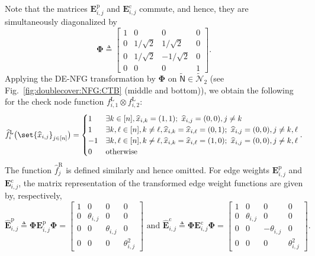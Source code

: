\documentclass[conference]{IEEEtran}
\theoremstyle{plain}
\theoremstyle{definition}
\newcommand{\sfn}{\mathsf{N}}
\newcommand{\fl}[1]{ f^{\mathrm{L}}_{ #1 } }
\newcommand{\hatfr}[1]{\widehat{f}^{\mathrm{R}}_{ #1 }}
\newcommand{\hatfl}[1]{\widehat{f}^{\mathrm{L}}_{ #1 }}
\newcommand{\hatx}[1]{\widehat{x}_{ #1 }}
\newcommand{\defeq}{\triangleq}
\begin{document}
 Note that the matrices $\mathbf E_{i,j}^{\mathrm{p}}$ and $\mathbf
 E_{i,j}^{\mathrm{c}}$ commute, and hence, they are simultaneously diagonalized
 by
 \[
  \boldsymbol{\Phi}\defeq\begin{bmatrix}
   1 & 0          & 0           & 0 \\
   0 & 1/\sqrt{2} & 1/\sqrt{2}  & 0 \\
   0 & 1/\sqrt{2} & -1/\sqrt{2} & 0 \\
   0 & 0          & 0           & 1
  \end{bmatrix}.
 \]
 Applying the DE-NFG transformation by $\boldsymbol \Phi$ on
 $\widetilde{\sfn}\in\widetilde{\mathcal{N}}_2$ (see
 Fig.~\ref{fig:doublecover:NFG:CTB} (middle and bottom)), we obtain the
 following for the check node function $\fl{i,1}\otimes \fl {i,2}$:
 \[
  \hatfl{i}\big(\set{\hatx{i,j}}_{j\in[n]}\big)
  =
  \begin{cases}
  1  & \exists k \in [n], \hatx{i,k}=(1,1);
  \ \hatx{i,j}=(0,0),j\neq k                                                \\
  1  & \exists k, \ell \in [n], k\neq \ell, \hatx{i,k}=\hatx{i,\ell}=(0,1);
  \ \hatx{i,j}=(0,0),j\neq k,\ell                                           \\
  -1 & \exists k, \ell \in [n], k\neq \ell, \hatx{i,k}=\hatx{i,\ell}=(1,0);
  \ \hatx{i,j}=(0,0),j\neq k,\ell                                           \\
  0  & \text{otherwise}
  \end{cases}.
 \]
 The function $\hatfr{j}$ is defined similarly and hence omitted. For edge
 weights $\mathbf E^{\mathrm p}_{i,j}$ and $\mathbf E^{\mathrm c}_{i,j}$, the matrix
 representation of the transformed edge weight functions are given by,
 respectively,
 \[
  \widehat{\mathbf E}^{\mathrm p}_{i,j}\defeq \boldsymbol{\Phi} \mathbf{E}^{\mathrm p}_{i,j} \boldsymbol{\Phi} =
  \begin{bmatrix}
   1 & 0            & 0            & 0               \\
   0 & \theta_{i,j} & 0            & 0               \\
   0 & 0            & \theta_{i,j} & 0               \\
   0 & 0            & 0            & \theta_{i,j} ^2
  \end{bmatrix}\text{ and }
  \widehat{\mathbf E}^{\mathrm c}_{i,j}\defeq \boldsymbol{\Phi} \mathbf{E}^{\mathrm c}_{i,j} \boldsymbol{\Phi} =
  \begin{bmatrix}
   1 & 0            & 0             & 0               \\
   0 & \theta_{i,j} & 0             & 0               \\
   0 & 0            & -\theta_{i,j} & 0               \\
   0 & 0            & 0             & \theta_{i,j} ^2
  \end{bmatrix}.
 \]
\end{document}
